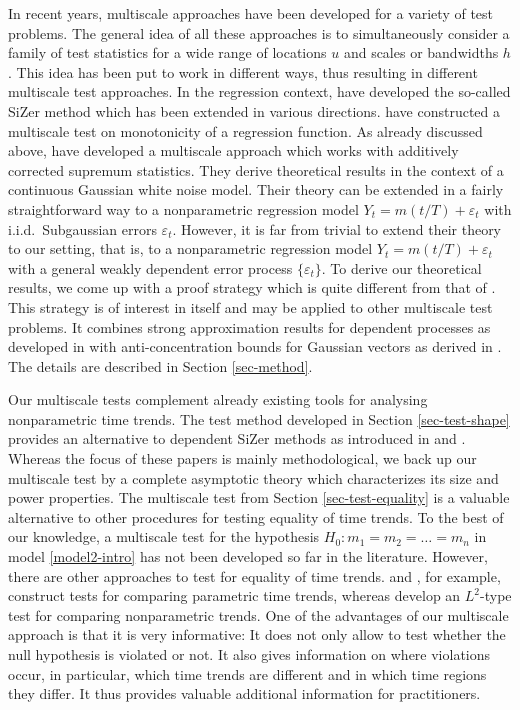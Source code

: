 In recent years, multiscale approaches have been developed for a variety of test problems. The general idea of all these approaches is to simultaneously consider a family of test statistics for a wide range of locations $u$ and scales or bandwidths $h$. This idea has been put to work in different ways, thus resulting in different multiscale test approaches. In the regression context, \cite{ChaudhuriMarron1999,ChaudhuriMarron2000} have developed the so-called SiZer method which has been extended in various directions.
\cite{HallHeckman2000} have constructed a multiscale test on monotonicity of a regression function. As already discussed above, \cite{DuembgenSpokoiny2001} have developed a multiscale approach which works with additively corrected supremum statistics. They derive theoretical results in the context of  a continuous Gaussian white noise model. Their theory can be extended in a fairly straightforward way to a nonparametric regression model $Y_t = m(t/T) + \varepsilon_t$ with i.i.d.\ Subgaussian errors $\varepsilon_t$. However, it is far from trivial to extend their theory to our setting, that is, to a nonparametric regression model $Y_t = m(t/T) + \varepsilon_t$ with a general weakly dependent error process $\{\varepsilon_t\}$. To derive our theoretical results, we come up with a proof strategy which is quite different from that of \cite{DuembgenSpokoiny2001}. This strategy is of interest in itself and may be applied to other multiscale test problems. It combines strong approximation results for dependent processes as developed in \cite{BerkesLiuWu2014} with anti-concentration bounds for Gaussian vectors as derived in \cite{Chernozhukov2015}. The details are described in Section \ref{sec-method}.


Our multiscale tests complement already existing tools for analysing nonparametric time trends. The test method developed in Section \ref{sec-test-shape} provides an alternative to dependent SiZer methods as introduced in \cite{Rondonotti2004} and \cite{Rondonotti2007}. Whereas the focus of these papers is mainly methodological, we back up our multiscale test by a complete asymptotic theory which characterizes its size and power properties. The multiscale test from Section \ref{sec-test-equality} is a valuable alternative to other procedures for testing equality of time trends. To the best of our knowledge, a multiscale test for the hypothesis $H_0: m_1 = m_2 = \ldots = m_n$ in model \eqref{model2-intro} has not been developed so far in the literature. However, there are other approaches to test for equality of time trends. \cite{Vogelsang2005} and \cite{Lyubchich2016}, for example, construct tests for comparing parametric time trends, whereas \cite{DegrasWu2012} develop an $L^2$-type test for comparing nonparametric trends. One of the advantages of our multiscale approach is that it is very informative: It does not only allow to test whether the null hypothesis is violated or not. It also gives information on where violations occur, in particular, which time trends are different and in which time regions they differ. It thus provides valuable additional information for practitioners. 


